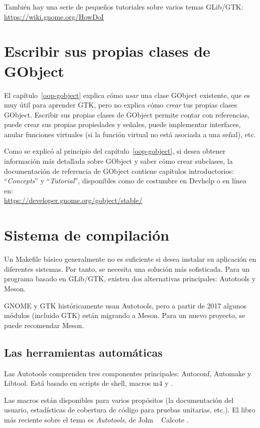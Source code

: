 También hay una serie de pequeños tutoriales sobre varios temas GLib/GTK: \\
\url{https://wiki.gnome.org/HowDoI}

\section{Escribir sus propias clases de GObject}

El capítulo~\ref{oop-gobject} explica cómo \emph{usar} una clase GObject existente, que es muy útil para aprender GTK, pero no explica cómo \emph{crear} tus propias clases GObject. Escribir sus propias clases de GObject permite contar con referencias, puede crear sus propias propiedades y señales, puede implementar interfaces, anular funciones virtuales (si la función virtual no está asociada a una señal), etc.

Como se explicó al principio del capítulo~\ref{oop-gobject}, si desea obtener información más detallada sobre GObject y saber cómo crear subclases, la documentación de referencia de GObject contiene capítulos introductorios: ``\emph{Concepts}'' y ``\emph{Tutorial}'', disponibles como de costumbre en Devhelp o en línea en: \\
\url{https://developer.gnome.org/gobject/stable/}

\section{Sistema de compilación}

Un Makefile básico generalmente no es suficiente si desea instalar su aplicación en diferentes sistemas. Por tanto, se necesita una solución más sofisticada. Para un programa basado en GLib/GTK, existen dos alternativas principales: Autotools y Meson.

GNOME y GTK históricamente usan Autotools, pero a partir de 2017 algunos módulos (incluido GTK) están migrando a Meson. Para un nuevo proyecto, se puede recomendar Meson.

\subsection{Las herramientas automáticas}

Las Autotools comprenden tres componentes principales: Autoconf, Automake y Libtool. Está basado en scripts de shell, macros m4 y .

Las macros están disponibles para varios propósitos (la documentación del usuario, estadísticas de cobertura de código para pruebas unitarias, etc.). El libro más reciente sobre el tema es \emph{Autotools}, de John ~ Calcote \cite{autotools}.

